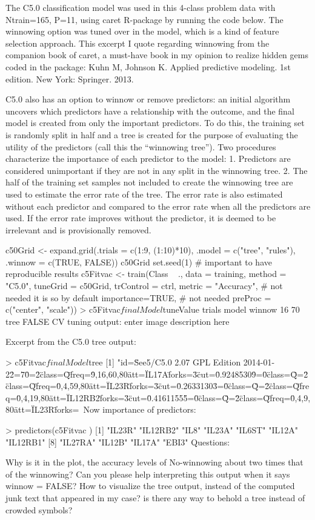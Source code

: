 The C5.0 classification model was used in this 4-class problem data with Ntrain=165, P=11, using caret R-package by running the code below. The winnowing option was tuned over in the model, which is a kind of feature selection approach. This excerpt I quote regarding winnowing from the companion book of caret, a must-have book in my opinion to realize hidden gems coded in the package:
Kuhn M, Johnson K. Applied predictive modeling. 1st edition. New York: Springer. 2013.

C5.0 also has an option to winnow or remove predictors: an initial algorithm uncovers which predictors have a relationship with the outcome, and the ﬁnal model is created from only the important predictors. To do this, the training set is randomly split in half and a tree is created for the purpose of evaluating the utility of the predictors (call this the “winnowing tree”). Two procedures characterize the importance of each predictor to the model: 1. Predictors are considered unimportant if they are not in any split in the winnowing tree. 2. The half of the training set samples not included to create the winnowing tree are used to estimate the error rate of the tree. The error rate is also estimated without each predictor and compared to the error rate when all the predictors are used. If the error rate improves without the predictor, it is deemed to be irrelevant and is provisionally removed.

c50Grid <- expand.grid(.trials = c(1:9, (1:10)*10),
                       .model = c("tree", "rules"),
                       .winnow = c(TRUE, FALSE))
c50Grid
set.seed(1) # important to have reproducible results
c5Fitvac <- train(Class ~ .,
                   data = training,
                   method = "C5.0",
                   tuneGrid = c50Grid,
                   trControl = ctrl,
                   metric = "Accuracy", # not needed it is so by default
                   importance=TRUE, # not needed
                   preProc = c("center", "scale"))  
> c5Fitvac$finalModel$tuneValue
   trials model winnow
16     70  tree  FALSE  
CV tuning output:
enter image description here

Excerpt from the C5.0 tree output:

> c5Fitvac$finalModel$tree
[1] "id=\"See5/C5.0 2.07 GPL Edition 2014-01-22\"\nentries=\"70\"\ntype=\"2\" class=\"Q\" freq=\"9,16,60,80\" att=\"IL17A\" forks=\"3\" cut=\"0.92485309\"\ntype=\"0\" class=\"Q\"\ntype=\"2\" class=\"Q\" freq=\"0,4,59,80\" att=\"IL23R\" forks=\"3\" cut=\"0.26331303\"\ntype=\"0\" class=\"Q\"\ntype=\"2\" class=\"Q\" freq=\"0,4,19,80\" att=\"IL12RB2\" forks=\"3\" cut=\"0.41611555\"\ntype=\"0\" class=\"Q\"\ntype=\"2\" class=\"Q\" freq=\"0,4,9,80\" att=\"IL23R\" forks=\   
Now importance of predictors:

> predictors(c5Fitvac )
 [1] "IL23R"   "IL12RB2" "IL8"     "IL23A"   "IL6ST"   "IL12A"   "IL12RB1"
 [8] "IL27RA"  "IL12B"   "IL17A"   "EBI3"
Questions:

Why is it in the plot, the accuracy levels of No-winnowing about two times that of the winnowing? Can you please help interpreting this output when it says winnow = FALSE?
How to visualize the tree output, instead of the computed junk text that appeared in my case? is there any way to behold a tree instead of crowded symbols?
